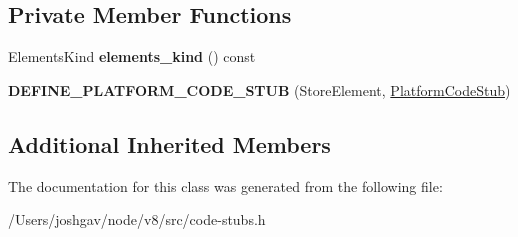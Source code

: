 \subsection*{Private Member Functions}
\begin{DoxyCompactItemize}
\item 
Elements\+Kind {\bfseries elements\+\_\+kind} () const \hypertarget{classv8_1_1internal_1_1_store_element_stub_accb3e9d2e36d89658f5e9964945af6a7}{}\label{classv8_1_1internal_1_1_store_element_stub_accb3e9d2e36d89658f5e9964945af6a7}

\item 
{\bfseries D\+E\+F\+I\+N\+E\+\_\+\+P\+L\+A\+T\+F\+O\+R\+M\+\_\+\+C\+O\+D\+E\+\_\+\+S\+T\+UB} (Store\+Element, \hyperlink{classv8_1_1internal_1_1_platform_code_stub}{Platform\+Code\+Stub})\hypertarget{classv8_1_1internal_1_1_store_element_stub_a47d6f54a9bfd6c60cf03862cc2a12fd7}{}\label{classv8_1_1internal_1_1_store_element_stub_a47d6f54a9bfd6c60cf03862cc2a12fd7}

\end{DoxyCompactItemize}
\subsection*{Additional Inherited Members}


The documentation for this class was generated from the following file\+:\begin{DoxyCompactItemize}
\item 
/\+Users/joshgav/node/v8/src/code-\/stubs.\+h\end{DoxyCompactItemize}
